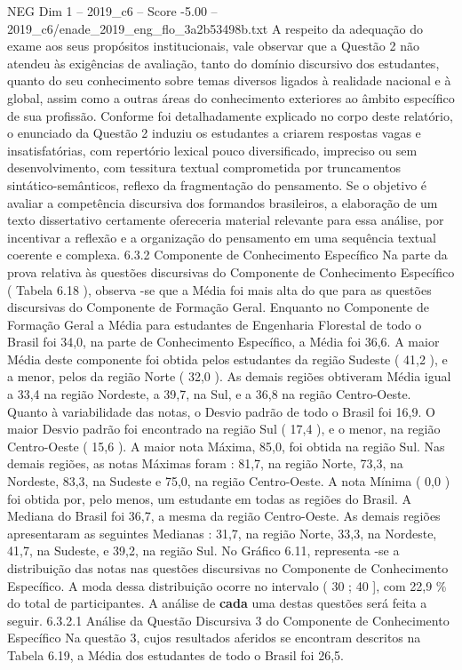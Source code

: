 \begin{textsample}{NEG Dim 1 – 2019\_c6 – Score -5.00 – 2019\_c6/enade\_2019\_eng\_flo\_3a2b53498b.txt}
A respeito da adequação do exame aos seus propósitos institucionais, vale observar que a Questão 2 não atendeu às exigências de avaliação, tanto do domínio discursivo dos estudantes, quanto do seu conhecimento sobre temas diversos ligados à realidade nacional e à global, assim como a outras áreas do conhecimento exteriores ao âmbito específico de sua profissão.
Conforme foi detalhadamente explicado no corpo deste relatório, o enunciado da Questão 2 induziu os estudantes a criarem respostas vagas e insatisfatórias, com repertório lexical pouco diversificado, impreciso ou sem desenvolvimento, com tessitura textual comprometida por truncamentos sintático-semânticos, reflexo da fragmentação do pensamento.
Se o objetivo é avaliar a competência discursiva dos formandos brasileiros, a elaboração de um texto dissertativo certamente ofereceria material relevante para essa análise, por incentivar a reflexão e a organização do pensamento em uma sequência textual coerente e complexa. 6.3.2 Componente de Conhecimento Específico Na parte da prova relativa às questões discursivas do Componente de Conhecimento Específico ( Tabela 6.18 ), observa -se que a Média foi mais alta do que para as questões discursivas do Componente de Formação Geral.
Enquanto no Componente de Formação Geral a Média para estudantes de Engenharia Florestal de todo o Brasil foi 34,0, na parte de Conhecimento Específico, a Média foi 36,6.
A maior Média deste componente foi obtida pelos estudantes da região Sudeste ( 41,2 ), e a menor, pelos da região Norte ( 32,0 ).
As demais regiões obtiveram Média igual a 33,4 na região Nordeste, a 39,7, na Sul, e a 36,8 na região Centro-Oeste.
Quanto à variabilidade das notas, o Desvio padrão de todo o Brasil foi 16,9.
O maior Desvio padrão foi encontrado na região Sul ( 17,4 ), e o menor, na região Centro-Oeste ( 15,6 ).
A maior nota Máxima, 85,0, foi obtida na região Sul.
Nas demais regiões, as notas Máximas foram : 81,7, na região Norte, 73,3, na Nordeste, 83,3, na Sudeste e 75,0, na região Centro-Oeste.
A nota Mínima ( 0,0 ) foi obtida por, pelo menos, um estudante em todas as regiões do Brasil.
A Mediana do Brasil foi 36,7, a mesma da região Centro-Oeste.
As demais regiões apresentaram as seguintes Medianas : 31,7, na região Norte, 33,3, na Nordeste, 41,7, na Sudeste, e 39,2, na região Sul.
No Gráfico 6.11, representa -se a distribuição das notas nas questões discursivas no Componente de Conhecimento Específico.
A moda dessa distribuição ocorre no intervalo ( 30 ; 40 ], com 22,9 \% do total de participantes.
A análise de \textbf{cada} uma destas questões será feita a seguir. 6.3.2.1 Análise da Questão Discursiva 3 do Componente de Conhecimento Específico Na questão 3, cujos resultados aferidos se encontram descritos na Tabela 6.19, a Média dos estudantes de todo o Brasil foi 26,5.

\end{textsample}
